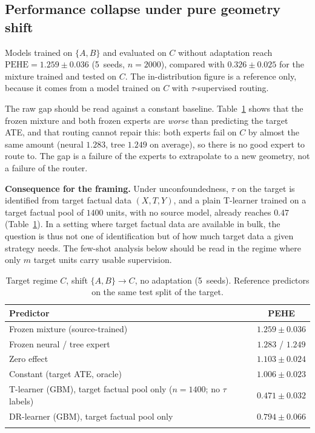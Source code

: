 \documentclass[pdflatex,sn-mathphys-num]{sn-jnl}
\newcommand{\PEHE}{\mathrm{PEHE}}
\begin{document}
\subsection{Performance collapse under pure geometry shift}
\label{sec:gap}
Models trained on $\{A,B\}$ and evaluated on $C$ without adaptation reach $\PEHE=1.259\pm0.036$ (5~seeds, $n=2000$), compared with $0.326\pm0.025$ for the mixture trained and tested on $C$. The in-distribution figure is a reference only, because it comes from a model trained on $C$ with $\tau$-supervised routing.

The raw gap should be read against a constant baseline. Table~\ref{tab:gap} shows that the frozen mixture and both frozen experts are \emph{worse} than predicting the target ATE, and that routing cannot repair this: both experts fail on $C$ by almost the same amount (neural $1.283$, tree $1.249$ on average), so there is no good expert to route to. The gap is a failure of the experts to extrapolate to a new geometry, not a failure of the router.

\medskip\noindent\textbf{Consequence for the framing.} Under unconfoundedness, $\tau$ on the target is identified from target factual data $(X,T,Y)$, and a plain T-learner trained on a target factual pool of $1400$ units, with no source model, already reaches $0.47$ (Table~\ref{tab:gap}). In a setting where target factual data are available in bulk, the question is thus not one of identification but of how much target data a given strategy needs. The few-shot analysis below should be read in the regime where only $m$ target units carry usable supervision.

\begin{table}[htbp]
\centering
\caption{Target regime $C$, shift $\{A,B\}\to C$, no adaptation (5~seeds). Reference predictors on the same test split of the target.}
\label{tab:gap}
\begin{tabular}{@{}lc@{}}
\toprule
Predictor & PEHE\\
\midrule
Frozen mixture (source-trained) & $1.259\pm0.036$\\
Frozen neural / tree expert & $1.283$ / $1.249$\\
Zero effect & $1.103\pm0.024$\\
Constant (target ATE, oracle) & $1.006\pm0.023$\\
T-learner (GBM), target factual pool only ($n=1400$; no $\tau$ labels) & $0.471\pm0.032$\\
DR-learner (GBM), target factual pool only & $0.794\pm0.066$\\
\botrule
\end{tabular}
\end{table}
\end{document}
